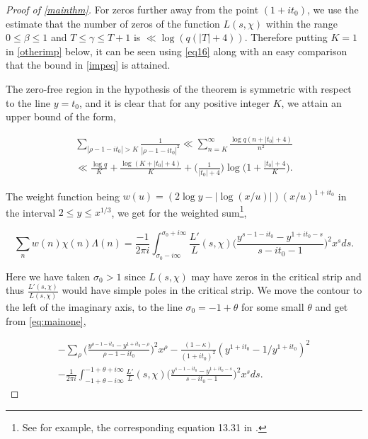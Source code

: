 \documentclass[10pt,a4paper]{amsart}
\begin{document}
\begin{proof}[Proof of \cref{mainthm}]
For zeros further away from the point $(1+it_0)$, we use the estimate that the number of zeros of the function $L(s,\chi)$ within the range $0\leq \beta \leq 1$ and $T\leq \gamma \leq T+1$ is $\ll \log (q(|T|+4))$. Therefore putting $K=1$ in \cref{otherimp} below, it can be seen using \cref{eq16} along with an easy comparison that the bound in \cref{impeq} is attained. 

The zero-free region in the hypothesis of the theorem is symmetric with respect to the line $y=t_0$, and it is clear that for any positive integer $K$, we attain an upper bound of the form,

\begin{multline}\label{otherimp}
     \sum\limits_{|\rho-1-it_0|>K} \frac{1}{|\rho-1-it_0|^{2}} \ll \sum\limits_{n=K}^{\infty} \frac{\log q(n+|t_0|+4)}{n^{2}} \\ \ll \frac{\log q}{K}+\frac{\log(K+|t_0|+4)}{K}+ \Big(\frac{1}{|t_0|+4}\Big)\log\Big(1+ \frac{|t_0|+4}{K}\Big).
\end{multline}




The weight function being $w(u)= (2\log y -|\log(x/u)|)(x/u)^{1+it_0}$ in the interval $2\leq y \leq x^{1/3}$, we get for the weighted sum\footnote{See for example, the corresponding equation 13.31 in \cite{Mont}.},


\begin{equation}\label{eq:mainone}
\sum\limits_{n} w(n)\chi(n)\Lambda(n)= \frac{-1}{2\pi i} \int_{\sigma_0 -i\infty}^{\sigma_0 +i\infty} \frac{L'}{L}(s,\chi) \Bigg(\frac{y^{s-1-it_0}-y^{1+it_0-s}}{s-it_0-1} \Bigg)^{2} x^{s}ds.
\end{equation}


\noindent Here we have taken $\sigma_0 >1$ since $L(s,\chi)$ may have zeros in the critical strip and thus $\frac{L'(s,\chi)}{L(s,\chi)}$ would have simple poles in the critical strip. We move the contour to the left of the imaginary axis, to the line $\sigma_0 = -1+\theta$ for some small $\theta$ and get from \cref{eq:mainone},

\begin{multline}\label{eq:imp2}
    -\sum\limits_{\rho}\Big( \frac{y^{\rho -1-it_0}-y^{1+it_0-\rho}}{\rho -1-it_0}  \Big)^{2}x^{\rho} -\frac{(1-\kappa)}{(1+it_0)^{2}}(y^{1+it_0}- 1/y^{1+it_0})^{2} \\ -\frac{1}{2\pi i} \int_{-1+\theta -i\infty}^{-1+\theta +i\infty} \frac{L'}{L}(s,\chi) \Big( \frac{y^{s-1-it_0}-y^{1+it_0-s}}{s-it_0-1} \Big)^{2}x^{s}ds.
\end{multline}


\end{proof}
\end{document}
